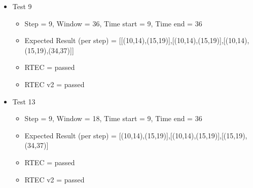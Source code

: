 \documentclass[8pt]{beamer}
\begin{document}
\begin{frame}
    \begin{itemize}
        \item Test 9
            \begin{itemize}
                \item Step = 9, Window = 36, Time start = 9, Time end = 36
                \item Expected Result (per step) = [[(10,14),(15,19)],[(10,14),(15,19)],[(10,14),(15,19),(34,37)]]
                \item RTEC = passed
                \item RTEC v2 = passed
            \end{itemize}
        \item Test 13
            \begin{itemize}
                \item Step = 9, Window = 18, Time start = 9, Time end = 36
                \item Expected Result (per step) = [(10,14),(15,19)],[(10,14),(15,19)],[(15,19),(34,37)]
                \item RTEC = passed
                \item RTEC v2 = passed
            \end{itemize}
    \end{itemize}
\end{frame}
\end{document}
